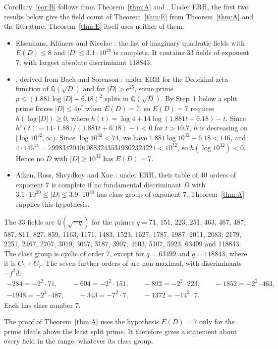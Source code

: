\documentclass[11pt]{amsart}
\theoremstyle{remark}
\newcommand{\Q}{\mathbb{Q}}
\begin{document}
Corollary~\ref{cor:B} follows from Theorem~\ref{thm:A} and \cite[Theorem~1.3(6)]{ARSX}. Under ERH, the first two results below give the field count of Theorem~\ref{thm:E} from Theorem~\ref{thm:A} and the literature. Theorem~\ref{thm:E} itself uses neither of them.
\begin{itemize}
\item Elsenhans, Kl\"uners and Nicolae \cite[Theorem~1 and Table~1]{EKN}: the list of imaginary quadratic fields with $E(D)\le 8$ and $|D|\le 3.1\cdot10^{20}$ is complete. It contains $33$ fields of exponent $7$, with largest absolute discriminant $118843$.
\item \cite[Theorem~3]{EKN}, derived from Bach and Sorenson \cite{BS}: under ERH for the Dedekind zeta function of $\Q(\sqrt D)$ and for $|D|>e^{25}$, some prime $p\le(1.881\log|D|+6.18)^2$ splits in $\Q(\sqrt D)$. By Step~1 below a split prime forces $|D|\le4p^7$ when $E(D)=7$, so $E(D)=7$ requires $h(\log|D|)\ge0$, where $h(t)=\log4+14\log(1.881t+6.18)-t$. Since $h'(t)=14\cdot1.881/(1.881t+6.18)-1<0$ for $t>10.7$, $h$ is decreasing on $[\log10^{32},\infty)$. Since $\log10^{32}<74$, we have $1.881\log10^{32}+6.18<146$, and $4\cdot146^{14}=7998342040108832435319302324224<10^{32}$, so $h(\log10^{32})<0$. Hence no $D$ with $|D|\ge10^{32}$ has $E(D)=7$.
\item Aiken, Ross, Shvydkoy and Xue \cite[Theorem~1.3(6)]{ARSX}: under ERH, their table of $40$ orders of exponent $7$ is complete if no fundamental discriminant $D$ with $3.1\cdot10^{20}\le|D|\le3.9\cdot10^{30}$ has class group of exponent $7$. Theorem~\ref{thm:A} supplies this hypothesis.
\end{itemize}

The $33$ fields are $\Q(\sqrt{-q})$ for the primes $q={}$71, 151, 223, 251, 463, 467, 487, 587, 811, 827, 859, 1163, 1171, 1483, 1523, 1627, 1787, 1987, 2011, 2083, 2179, 2251, 2467, 2707, 3019, 3067, 3187, 3907, 4603, 5107, 5923, 63499 and 118843.
The class group is cyclic of order $7$, except for $q=63499$ and $q=118843$, where it is $C_7\times C_7$. The seven further orders of \cite[Table~A.7]{ARSX} are non-maximal, with discriminants $-f^2d$:
\begin{gather*}
-284=-2^2\cdot71,\qquad -604=-2^2\cdot151,\qquad -892=-2^2\cdot223,\qquad -1852=-2^2\cdot463,\\
-1948=-2^2\cdot487,\qquad -343=-7^2\cdot7,\qquad -1372=-14^2\cdot7.
\end{gather*}
Each has class number $7$.

The proof of Theorem~\ref{thm:A} uses the hypothesis $E(D)=7$ only for the prime ideals above the least split prime. It therefore gives a statement about every field in the range, whatever its class group.
\end{document}
